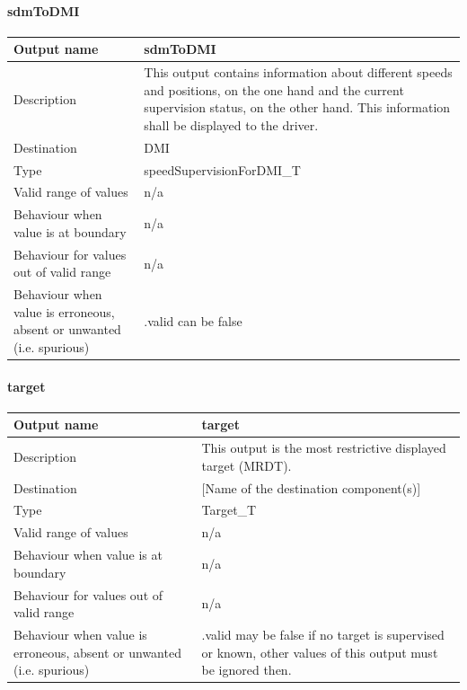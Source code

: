 \paragraph{sdmToDMI}

\begin{longtable}{p{}p{}}
\toprule
Output name				& sdmToDMI \\
\midrule
Description				& This output contains information about different speeds and positions, on the one hand and the current supervision status, on the other hand. This information shall be displayed to the driver. \\
\midrule
Destination				& DMI \\ 
\midrule
Type					& speedSupervisionForDMI\_T \\
\midrule
Valid range of values	& n/a \\
\midrule
Behaviour when value is at boundary	& n/a \\
\midrule
Behaviour for values out of valid range	& n/a \\
\midrule
Behaviour when value is erroneous, absent or unwanted (i.e. spurious) & .valid can be false \\
\bottomrule
\end{longtable}


\paragraph{target}

\begin{longtable}{p{}p{}}
\toprule
Output name				& target \\
\midrule
Description				& This output is the most restrictive displayed target (MRDT). \\
\midrule
Destination				& [Name of the destination component(s)] \\ 
\midrule
Type					& Target\_T \\
\midrule
Valid range of values	& n/a \\
\midrule
Behaviour when value is at boundary	& n/a \\
\midrule
Behaviour for values out of valid range	& n/a \\
\midrule
Behaviour when value is erroneous, absent or unwanted (i.e. spurious) & .valid may be false if no target is supervised or known, other values of this output must be ignored then. \\
\bottomrule
\end{longtable}


